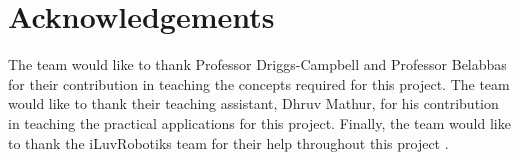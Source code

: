 \section*{Acknowledgements}
    
    The team would like to thank Professor Driggs-Campbell and Professor Belabbas for their contribution in teaching the concepts required for this project. The team would like to thank their teaching assistant, Dhruv Mathur, for his contribution in teaching the practical applications for this project. Finally, the team would like to thank the iLuvRobotiks team for their help throughout this project \cite{iluvrobotiks}.

\printbibliography[
title={References}
] 

\newpage

